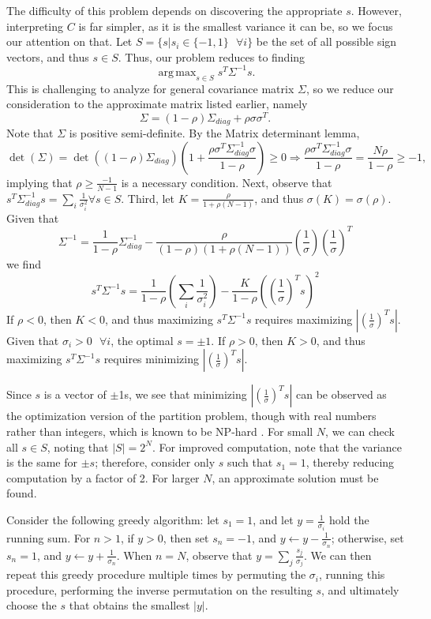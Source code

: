\documentclass[10pt,twoside,titlepage]{article}   %
\DeclareMathOperator*{\argmax}{arg\,max}
\begin{document}
The difficulty of this problem depends on discovering the appropriate $s$. 
However, interpreting $C$ is far simpler, as it is the smallest variance it can be, so we focus our attention on that. 
Let $S = \{s | s_i \in \{-1,1\} \textrm{ } \forall i \}$ be the set of all possible sign vectors, 
and thus $s \in S$. 
Thus, our problem reduces to finding
\[
\argmax_{s\in S} s^T \Sigma^{-1} s.
\]
This is challenging to analyze for general covariance matrix $\Sigma$, 
so we reduce our consideration to the approximate matrix listed earlier, 
namely
\[
\Sigma = (1-\rho) \Sigma_{diag} + \rho \sigma \sigma^T.
\]
Note that $\Sigma$ is positive semi-definite. 
By the Matrix determinant lemma,
\[
\operatorname{det}(\Sigma) = \operatorname{det}( (1-\rho)\Sigma_{diag}) \left( 1 + \frac{\rho \sigma^T \Sigma_{diag}^{-1} \sigma}{1-\rho} \right) \geq 0 \Rightarrow \frac{\rho \sigma^T \Sigma_{diag}^{-1} \sigma}{1-\rho} = \frac{ N\rho}{1-\rho} \geq -1 ,
\]
implying that $\rho \geq \frac{-1}{N-1}$ is a necessary condition. 
Next, observe that $s^T \Sigma_{diag}^{-1} s = \sum_i \frac{1}{ \sigma_i^2 } \forall s \in S$. 
Third, let $K = \frac{\rho}{ 1+ \rho (N-1) }$, and thus $\sigma(K)= \sigma(\rho)$. 
Given that
\[
\Sigma^{-1} = \frac{1}{1 - \rho} \Sigma_{diag}^{-1} - \frac{ \rho }{ (1-\rho) (1 + \rho (N-1) ) } \left( \frac{1}{\sigma} \right) \left( \frac{1}{\sigma} \right)^T
\]
we find
\[
s^T \Sigma^{-1} s = \frac{1}{1-\rho} \left( \sum_i \frac{1}{\sigma_i^2} \right) - \frac{K}{1-\rho} \left( \left( \frac{1}{\sigma} \right)^T s \right)^2
\]
If $\rho < 0$, then $K<0$, and thus maximizing $s^T \Sigma^{-1} s$ 
requires maximizing $| \left( \frac{1}{\sigma} \right)^T s |$. 
Given that $\sigma_i>0 \textrm{ } \forall i$, the optimal $s = \pm 1$. 
If $\rho > 0$, then $K > 0$, 
and thus maximizing $s^T \Sigma^{-1} s$ requires minimizing $| \left( \frac{1}{\sigma} \right)^T s |$.

Since $s$ is a vector of $\pm$1s, we see that minimizing $| \left( \frac{1}{\sigma} \right)^T s |$ 
can be observed as the optimization version of the partition problem, though with real numbers rather than integers, 
which is known to be NP-hard \cite{NPComplete}. 
For small $N$, we can check all $s \in S$, noting that $|S|=2^N$. 
For improved computation, note that the variance is the same for $\pm s$; 
therefore, consider only $s$ such that $s_1=1$, 
thereby reducing computation by a factor of 2. 
For larger $N$, an approximate solution must be found.

Consider the following greedy algorithm: let $s_1=1$, 
and let $y= \frac{1}{\sigma_i}$ hold the running sum. 
For $n > 1$, if $y>0$, then set $s_n = -1$, 
and $ y \leftarrow y - \frac{1}{\sigma_n}$; 
otherwise, set $s_n=1$, and $y \leftarrow y + \frac{1}{\sigma_n}$. 
When $n=N$, observe that $y=\sum_j \frac{ s_j }{ \sigma_j }$. 
We can then repeat this greedy procedure multiple times by permuting 
the $\sigma_i$, running this procedure, performing the inverse permutation 
on the resulting $s$, and ultimately choose the $s$ that obtains 
the smallest $|y|$.
\end{document}
